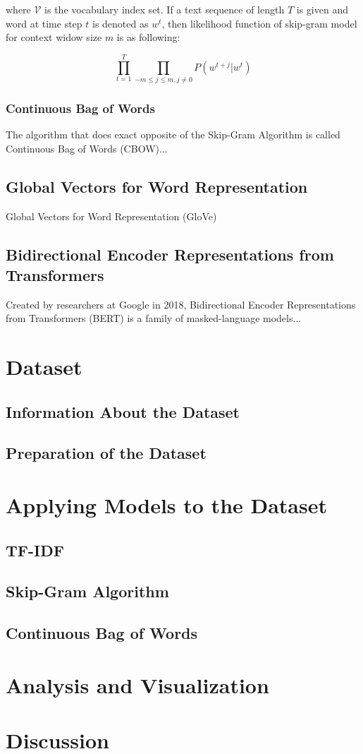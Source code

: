 \documentclass[man]{apa7}
\begin{document}
where $ \mathcal{V}$ is the vocabulary index set. If a text sequence of length $T$ is given and word at time step $t$ is denoted as $\mathit{w}^t$, then likelihood function of skip-gram model for context widow size $m$ is as following:

$$\prod_{t=1}^T \prod_{-m \le j \le m , j \neq 0} P(w^{t+j} | w^t)$$

\subsubsection{Continuous Bag of Words}
The algorithm that does exact opposite of the Skip-Gram Algorithm is called Continuous Bag of Words (CBOW)...
\subsection{Global Vectors for Word Representation}
Global Vectors for Word Representation (GloVe)
\subsection{Bidirectional Encoder Representations from Transformers}
Created by researchers at Google in 2018, Bidirectional Encoder Representations from Transformers (BERT) is a family of masked-language models...
\section{Dataset}
\subsection{Information About the Dataset}
\subsection{Preparation of the Dataset}
\section{Applying Models to the Dataset}
\subsection{TF-IDF}

\subsection{Skip-Gram Algorithm}
\subsection{Continuous Bag of Words}

\section{Analysis and Visualization}
\section{Discussion}
\end{document}

